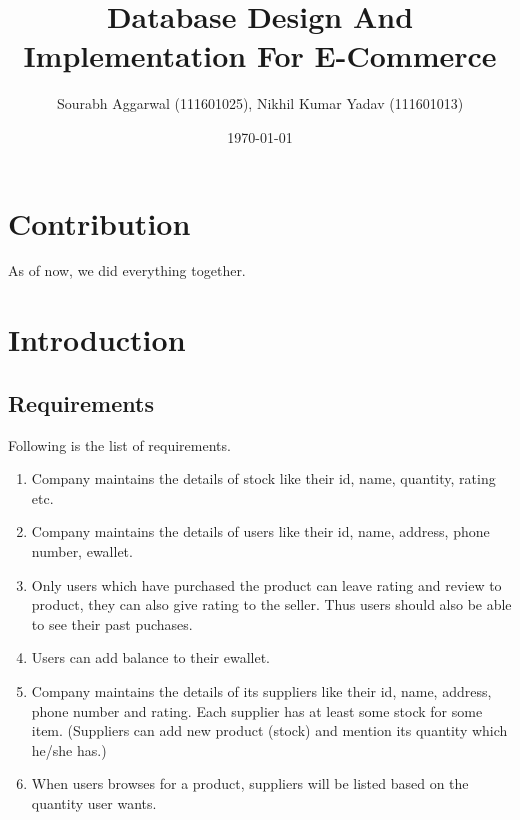 \documentclass[a4paper,12pt]{article} %
\begin{document}
\title{Database Design And Implementation For E-Commerce}
\author{\small{Sourabh Aggarwal (111601025), Nikhil Kumar Yadav (111601013)}}
\date{\today}
\maketitle
{}
\tableofcontents
\newpage
{}
\section{Contribution}
As of now, we did everything together.
\section{Introduction}

\subsection{Requirements}
Following is the list of requirements.

\begin{enumerate}
\item Company maintains the details of stock like their id, name, quantity, rating etc.

\item Company maintains the details of users like their id, name, address, phone number, ewallet.

\item Only users which have purchased the product can leave rating and review to product, they can also give rating to the seller. Thus users should also be able to see their past puchases.

\item Users can add balance to their ewallet.

\item Company maintains the details of its suppliers like their id, name, address, phone number and rating. Each supplier has at least some stock for some item. (Suppliers can add new product (stock) and mention its quantity which he/she has.)

\item When users browses for a product, suppliers will be listed based on the quantity user wants.
\end{enumerate}
\end{document}

